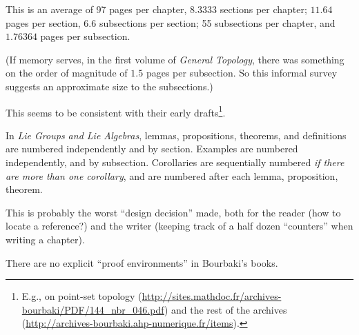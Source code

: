 \begin{node}
\begin{node}[Subsections]
This is an average of 97 pages per chapter, $8.3333$ sections per chapter;
$11.64$ pages per section, $6.6$ subsections per section; 55 subsections per
chapter, and $1.76364$ pages per subsection.

(If memory serves, in the first volume of \textit{General Topology},
there was something on the order of magnitude of $1.5$ pages per
subsection. So this informal survey suggests an approximate size to the
subsections.)

This seems to be consistent with their early drafts\footnote{E.g., on
point-set topology
(\url{http://sites.mathdoc.fr/archives-bourbaki/PDF/144_nbr_046.pdf})
and the rest of the
archives (\url{http://archives-bourbaki.ahp-numerique.fr/items}).}.
\end{node}

\begin{node}\label{bourbaki-0002}%
In \textit{Lie Groups and Lie Algebras}, lemmas, propositions, theorems,
and definitions are numbered independently and by section.
Examples are numbered independently, and by subsection. Corollaries are
sequentially numbered \emph{if there are more than one corollary}, and are
numbered after each lemma, proposition, theorem.

This is probably the worst ``design decision'' made, both for the reader
(how to locate a reference?) and the writer (keeping track of a half
dozen ``counters'' when writing a chapter).
\end{node}

\begin{node}[No ``proofs'']\label{bourbaki-0007}%
There are no explicit ``proof environments'' in Bourbaki's books.
\end{node}
\end{node}

